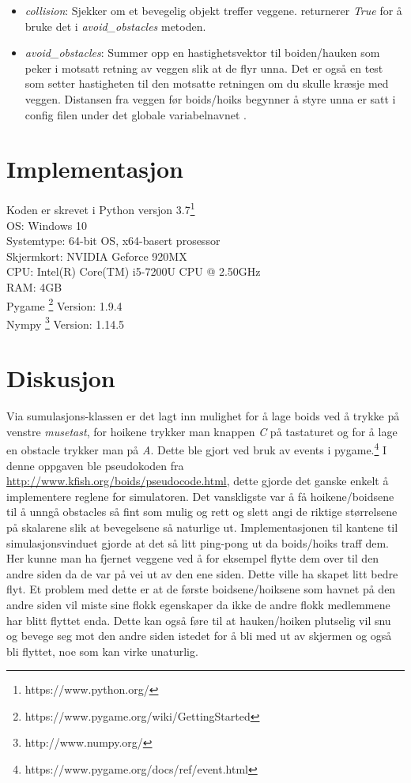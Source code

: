 {\begin{itemize}
    \item \emph{collision}: Sjekker om et bevegelig objekt treffer veggene. returnerer \emph{True} for å bruke det i \emph{avoid\_obstacles} metoden.
    \item \emph{avoid\_obstacles}: Summer opp en hastighetsvektor til boiden/hauken som peker i motsatt retning av veggen slik at de flyr unna. Det er også en test som setter hastigheten til den motsatte retningen om du skulle kræsje med veggen. Distansen fra veggen før boids/hoiks begynner å styre unna er satt i config filen under det globale variabelnavnet \color{purple}{WALL\_DISTANCE\_AVOID\_VALUE}.
\end{itemize}



\section{Implementasjon}
Koden er skrevet i Python versjon 3.7\footnote{https://www.python.org/}\\
OS: Windows 10\\
Systemtype: 64-bit OS, x64-basert prosessor\\
Skjermkort: NVIDIA Geforce 920MX\\
CPU: Intel(R) Core(TM) i5-7200U CPU @ 2.50GHz\\
RAM: 4GB\\
Pygame \footnote{https://www.pygame.org/wiki/GettingStarted} Version: 1.9.4\\
Nympy \footnote{http://www.numpy.org/} Version: 1.14.5\\



\section{Diskusjon}


Via sumulasjons-klassen er det lagt inn mulighet for å lage boids ved å trykke på venstre \emph{musetast}, for hoikene trykker man knappen \emph{C} på tastaturet og for å lage en obstacle trykker man på \emph{A}. Dette ble gjort ved bruk av events i pygame.\footnote{https://www.pygame.org/docs/ref/event.html} 
I denne oppgaven ble pseudokoden fra \url{http://www.kfish.org/boids/pseudocode.html}, dette gjorde det ganske enkelt å implementere reglene for simulatoren. Det vanskligste var å få hoikene/boidsene til å unngå obstacles så fint som mulig og rett og slett angi de riktige størrelsene på skalarene slik at bevegelsene så naturlige ut. Implementasjonen til kantene til simulasjonsvinduet gjorde at det så litt ping-pong ut da boids/hoiks traff dem. Her kunne man ha fjernet veggene ved å for eksempel flytte dem over til den andre siden da de var på vei ut av den ene siden. Dette ville ha skapet litt bedre flyt. Et problem med dette er at de første boidsene/hoiksene som havnet på den andre siden vil miste sine flokk egenskaper da ikke de andre flokk medlemmene har blitt flyttet enda. Dette kan også føre til at hauken/hoiken plutselig vil snu og bevege seg mot den andre siden istedet for å bli med ut av skjermen og også bli flyttet, noe som kan virke unaturlig.


}
